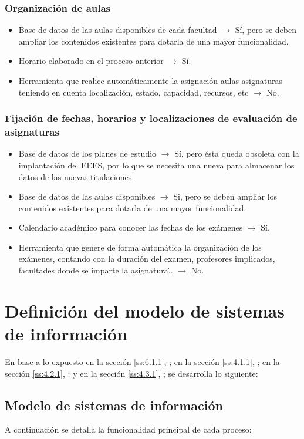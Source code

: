 \documentclass[11pt,a4paper,spanish,twoside]{report}
\begin{document}
\subsubsection{Organización de aulas}
\begin{itemize}
\item Base de datos de las aulas disponibles de cada facultad $\to$ Sí, pero
  se deben ampliar los contenidos existentes para dotarla de una mayor
  funcionalidad. 
\item Horario elaborado en el proceso anterior $\to$ Sí.
\item  Herramienta que realice automáticamente la asignación
  aulas-asignaturas teniendo en cuenta localización, estado, capacidad,
  recursos, etc $\to$ No.
\end{itemize}

\subsubsection{Fijación de fechas, horarios y localizaciones de evaluación de
  asignaturas} 
\begin{itemize}
\item Base de datos de los planes de estudio $\to$ Sí, pero ésta queda
  obsoleta con la implantación del EEES, por lo que se
  necesita una nueva para almacenar los datos de las nuevas titulaciones.  
\item Base de datos de las aulas disponibles $\to$ Si, pero se deben ampliar
  los contenidos existentes para dotarla de una mayor funcionalidad.
\item Calendario académico para conocer las fechas de los exámenes $\to$ Sí.
\item Herramienta que genere de forma automática la organización de los
    exámenes, contando con la duración del examen, profesores implicados,
    facultades donde se imparte la asignatura\... $\to$ No.
\end{itemize}

\section{Definición del modelo de sistemas de información}
En base a lo expuesto 
en la sección \vref{ss:6.1.1}, \emph{}; 
en la sección \vref{ss:4.1.1}, \emph{}; 
en la sección \vref{ss:4.2.1}, \emph{}; y
en la sección \vref{ss:4.3.1}, \emph{}; 
se desarrolla lo siguiente:

\subsection{Modelo de sistemas de información} \label{ss:6.2.1}
A continuación se detalla la funcionalidad principal de cada proceso:
\end{document}
